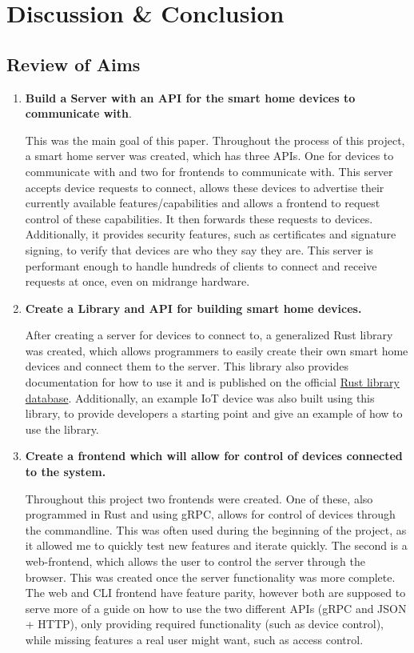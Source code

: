 \chapter{Discussion \& Conclusion} \label{cha:conclusion}
\section{Review of Aims}
\begin{enumerate}
    \item \textbf{Build a Server with an API for the smart home devices to communicate with}. 
    
        This was the main goal of this paper. Throughout the process of this project, a smart home server was created, which has three APIs. One for devices to communicate with and two for frontends to communicate with. This server accepts device requests to connect, allows these devices to advertise their currently available features/capabilities and allows a frontend to request control of these capabilities. It then forwards these requests to devices. Additionally, it provides security features, such as certificates and signature signing, to verify that devices are who they say they are. This server is performant enough to handle hundreds of clients to connect and receive requests at once, even on midrange hardware. 

    \item \textbf{Create a Library and API for building smart home devices.}

        After creating a server for devices to connect to, a generalized Rust library was created, which allows programmers to easily create their own smart home devices and connect them to the server. This library also provides documentation for how to use it and is published on the official \href{https://crates.io/crates/NOSHP-Client}{Rust library database}. Additionally, an example IoT device was also built using this library, to provide developers a starting point and give an example of how to use the library. 

    \item \textbf{Create a frontend which will allow for control of devices connected to the system.}

        Throughout this project two frontends were created. One of these, also programmed in Rust and using gRPC, allows for control of devices through the commandline. This was often used during the beginning of the project, as it allowed me to quickly test new features and iterate quickly. The second is a web-frontend, which allows the user to control the server through the browser. This was created once the server functionality was more complete. The web and CLI frontend have feature parity, however both are supposed to serve more of a guide on how to use the two different APIs (gRPC and JSON + HTTP), only providing required functionality (such as device control), while missing features a real user might want, such as access control.


\end{enumerate}
